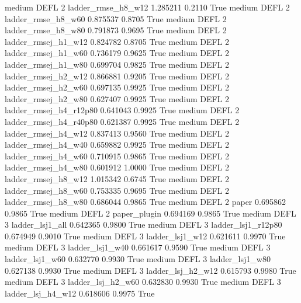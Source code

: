     medium     DEFL                 2     ladder_rmse_h8_w12   1.285211      0.2110    True
    medium     DEFL                 2     ladder_rmse_h8_w60   0.875537      0.8705    True
    medium     DEFL                 2     ladder_rmse_h8_w80   0.791873      0.9695    True
    medium     DEFL                 2    ladder_rmsej_h1_w12   0.824782      0.8705    True
    medium     DEFL                 2    ladder_rmsej_h1_w60   0.736179      0.9625    True
    medium     DEFL                 2    ladder_rmsej_h1_w80   0.699704      0.9825    True
    medium     DEFL                 2    ladder_rmsej_h2_w12   0.866881      0.9205    True
    medium     DEFL                 2    ladder_rmsej_h2_w60   0.697135      0.9925    True
    medium     DEFL                 2    ladder_rmsej_h2_w80   0.627407      0.9925    True
    medium     DEFL                 2 ladder_rmsej_h4_r12p80   0.641043      0.9925    True
    medium     DEFL                 2 ladder_rmsej_h4_r40p80   0.621387      0.9925    True
    medium     DEFL                 2    ladder_rmsej_h4_w12   0.837413      0.9560    True
    medium     DEFL                 2    ladder_rmsej_h4_w40   0.659882      0.9925    True
    medium     DEFL                 2    ladder_rmsej_h4_w60   0.710915      0.9865    True
    medium     DEFL                 2    ladder_rmsej_h4_w80   0.601912      1.0000    True
    medium     DEFL                 2    ladder_rmsej_h8_w12   1.015342      0.6745    True
    medium     DEFL                 2    ladder_rmsej_h8_w60   0.753335      0.9695    True
    medium     DEFL                 2    ladder_rmsej_h8_w80   0.686044      0.9865    True
    medium     DEFL                 2                  paper   0.695862      0.9865    True
    medium     DEFL                 2           paper_plugin   0.694169      0.9865    True
    medium     DEFL                 3        ladder_lsj1_all   0.642365      0.9800    True
    medium     DEFL                 3     ladder_lsj1_r12p80   0.674949      0.9010    True
    medium     DEFL                 3        ladder_lsj1_w12   0.621611      0.9970    True
    medium     DEFL                 3        ladder_lsj1_w40   0.661617      0.9590    True
    medium     DEFL                 3        ladder_lsj1_w60   0.632770      0.9930    True
    medium     DEFL                 3        ladder_lsj1_w80   0.627138      0.9930    True
    medium     DEFL                 3      ladder_lsj_h2_w12   0.615793      0.9980    True
    medium     DEFL                 3      ladder_lsj_h2_w60   0.632830      0.9930    True
    medium     DEFL                 3      ladder_lsj_h4_w12   0.618606      0.9975    True
